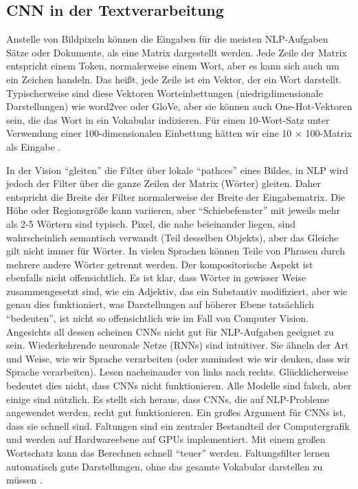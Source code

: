 \subsection{CNN in der Textverarbeitung}
Anstelle von Bildpixeln können die Eingaben für die meisten NLP-Aufgaben Sätze oder Dokumente, als eine Matrix dargestellt werden. Jede Zeile der Matrix entspricht einem Token, normalerweise einem Wort, aber es kann sich auch um ein Zeichen handeln. Das heißt, jede Zeile ist ein Vektor, der ein Wort darstellt. Typischerweise sind diese Vektoren Worteinbettungen (niedrigdimensionale Darstellungen) wie word2vec oder GloVe, aber sie können auch One-Hot-Vektoren sein, die das Wort in ein Vokabular indizieren. Für einen 10-Wort-Satz unter Verwendung einer 100-dimensionalen Einbettung hätten wir eine 10 × 100-Matrix als Eingabe \cite*{Zhang}.

In der Vision \enquote{gleiten} die Filter über lokale \enquote{pathces} eines Bildes, in NLP wird jedoch der Filter über die ganze Zeilen der Matrix (Wörter) gleiten. Daher entspricht die Breite der Filter normalerweise der Breite der Eingabematrix. Die Höhe oder Regionsgröße kann variieren, aber \enquote{Schiebefenster} mit jeweils mehr als 2-5 Wörtern sind typisch. Pixel, die nahe beieinander liegen, sind wahrscheinlich semantisch verwandt (Teil desselben Objekts), aber das Gleiche gilt nicht immer für Wörter. In vielen Sprachen können Teile von Phrasen durch mehrere andere Wörter getrennt werden. Der kompositorische Aspekt ist ebenfalls nicht offensichtlich. Es ist klar, dass Wörter in gewisser Weise zusammengesetzt sind, wie ein Adjektiv, das ein Substantiv modifiziert, aber wie genau dies funktioniert, was Darstellungen auf höherer Ebene tatsächlich \enquote{bedeuten}, ist nicht so offensichtlich wie im Fall von Computer Vision. Angesichts all dessen scheinen CNNs nicht gut für NLP-Aufgaben geeignet zu sein. Wiederkehrende neuronale Netze (RNNs) sind intuitiver. Sie ähneln der Art und Weise, wie wir Sprache verarbeiten (oder zumindest wie wir denken, dass wir Sprache verarbeiten). Lesen nacheinander von links nach rechts. Glücklicherweise bedeutet dies nicht, dass CNNs nicht funktionieren. Alle Modelle sind falsch, aber einige sind nützlich. Es stellt sich heraus, dass CNNs, die auf NLP-Probleme angewendet werden, recht gut funktionieren. Ein großes Argument für CNNs ist, dass sie schnell sind. Faltungen sind ein zentraler Bestandteil der Computergrafik und werden auf Hardwareebene auf GPUs implementiert. Mit einem großen Wortschatz kann das Berechnen schnell \enquote{teuer} werden. Faltungsfilter lernen automatisch gute Darstellungen, ohne das gesamte Vokabular darstellen zu müssen \cite*{widlml}.

